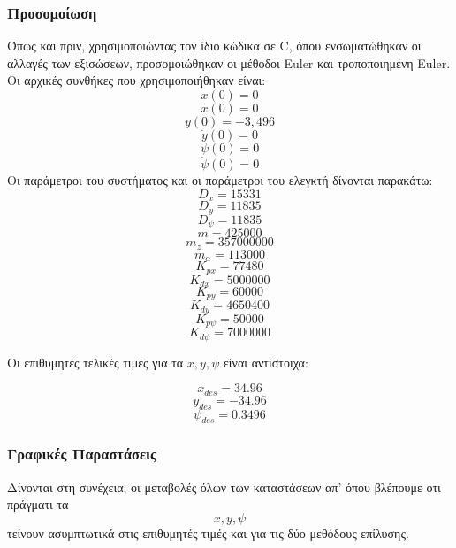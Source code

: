 \documentclass{article}
\begin{document}
\subsubsection{Προσομοίωση}
Όπως και πριν, χρησιμοποιώντας τον ίδιο κώδικα σε C, όπου ενσωματώθηκαν οι αλλαγές των εξισώσεων, προσομοιώθηκαν οι μέθοδοι Euler και τροποποιημένη Euler. Oι αρχικές συνθήκες που χρησιμοποιήθηκαν είναι:
\[x(0) = 0\]
\[\dot{x}(0) = 0\]
\[y(0) = -3,496\]
\[\dot{y}(0) = 0\]
\[\psi(0) = 0\]
\[\dot{\psi}(0) = 0\]
Οι παράμετροι του συστήματος και οι παράμετροι του ελεγκτή δίνονται παρακάτω:
\[D_x = 15331\]
\[D_y = 11835\]
\[D_\psi = 11835\]
\[m = 425000\]
\[m_z = 357000000\]
\[m_\alpha = 113000\]
\[K_{px} = 77480\]
\[K_{dx} = 5000000\]
\[K_{py} = 60000\]
\[K_{dy} = 4650400\]
\[K_{p\psi} = 50000\]
\[K_{d\psi} = 7000000\]

Οι επιθυμητές τελικές τιμές για τα \(x, y, \psi\) είναι αντίστοιχα: 

\[x_{des} = 34.96\]
\[y_{des} = -34.96\]
\[\psi_{des} = 0.3496\]

\subsubsection{Γραφικές Παραστάσεις}
Δίνονται στη συνέχεια, οι μεταβολές όλων των καταστάσεων απ' όπου βλέπουμε οτι πράγματι τα \[x, y, \psi\] τείνουν ασυμπτωτικά στις επιθυμητές τιμές και για τις δύο μεθόδους επίλυσης. 
\end{document}
